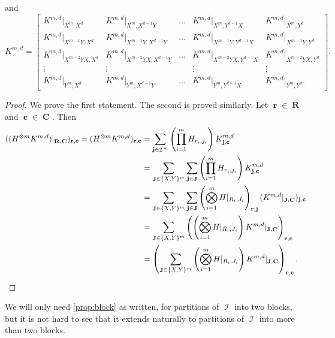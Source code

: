 \documentclass{article}
\theoremstyle{remark}
\theoremstyle{definition}
\DeclareMathOperator{\vr}{\mathbf{R}}
\DeclareMathOperator{\vrr}{\mathbf{r}}
\DeclareMathOperator{\vc}{\mathbf{C}}
\DeclareMathOperator{\vcc}{\mathbf{c}}
\DeclareMathOperator{\vj}{\mathbf{J}}
\DeclareMathOperator{\vjj}{\mathbf{j}}
\DeclareMathOperator{\ic}{\mathcal{I}}
\begin{document}
and
\[
    K^{m,d} =
    \begin{bmatrix} 
        K^{m,d}|_{X^{m},X^{d}} &
        K^{m,d}|_{X^{m},X^{d-1}Y} & \ldots &
        K^{m,d}|_{X^{m},Y^{d-1}X} & 
        K^{m,d}|_{X^{m},Y^{d}}\\
        K^{m,d}|_{X^{m-1}Y,X^{d}} &
        K^{m,d}|_{X^{m-1}Y,X^{d-1}Y} & \ldots & 
        K^{m,d}|_{X^{m-1}Y,Y^{d-1}X} & 
        K^{m,d}|_{X^{m-1}Y,Y^{d}}\\
        K^{m,d}|_{X^{m-2}YX,X^{d}} & 
        K^{m,d}|_{X^{m-2}YX,X^{d-1}Y} &\ldots & 
        K^{m,d}|_{X^{m-2}YX,Y^{d-1}X} & 
        K^{m,d}|_{X^{m-2}YX,Y^{d}} \\
        \vdots & \vdots && \vdots & \vdots \\
        K^{m,d}|_{Y^{m},X^{d}} &
        K^{m,d}|_{Y^{m},X^{d-1}Y} & \ldots & 
        K^{m,d}|_{Y^{m},Y^{d-1}X} &
        K^{m,d}|_{Y^{m},Y^{d}}.
    \end{bmatrix}.
\]
\begin{proof}
    We prove the first statement. The second is proved similarly.
    Let $\vrr \in \vr$ and $\vcc \in \vc$. Then
    \begin{align*}
        ((H^{\otimes m} K^{m,d})|_{\vr,\vc})_{\vrr,\vcc}
        = (H^{\otimes m} K^{m,d})_{\vrr,\vcc}
        &= \sum_{\vjj\in\ic^m} \left(\prod_{i=1}^m H_{r_i,j_i}\right)K^{m,d}_{\vjj,\vcc}\\
        &= \sum_{\vj\in\{X,Y\}^m} \sum_{\vjj\in\vj} \left(\prod_{i=1}^m H_{r_i,j_i}\right)K^{m,d}_{\vjj,\vcc}\\
        &= \sum_{\vj \in \{X,Y\}^m} \sum_{\vjj\in\vj}\left(\bigotimes_{i=1}^m H|_{R_i,J_i}\right)_{\vrr,\vjj} (K^{m,d}|_{\vj,\vc})_{\vjj,\vcc}\\
        &= \sum_{\vj \in \{X,Y\}^m} \left(\left(\bigotimes_{i=1}^m H|_{R_i,J_i}\right) K^{m,d}|_{\vj,\vc}\right)_{\vrr,\vcc} \\
        &= \left(\sum_{\vj \in \{X,Y\}^m} \left(\bigotimes_{i=1}^m H|_{R_i,J_i}\right) K^{m,d}|_{\vj,\vc}\right)_{\vrr,\vcc}. \qedhere
    \end{align*}
\end{proof}
We will only need \autoref{prop:block} as written, for partitions of $\ic$ into two blocks, but it is
not hard to see that it extends naturally to partitions of $\ic$ into more than two blocks.
\end{document}
